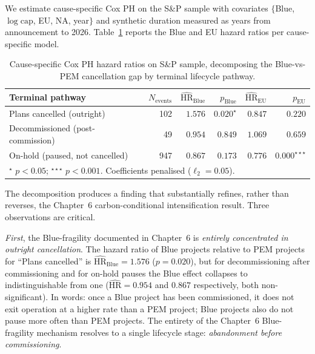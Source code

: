 \documentclass[11pt,a4paper]{article}
\begin{document}
We estimate cause-specific Cox PH on the S\&P sample with covariates $\{$Blue, $\log\mathrm{cap}$, EU, NA, year$\}$ and synthetic duration measured as years from announcement to 2026. Table~\ref{tab:ch8-cr} reports the Blue and EU hazard ratios per cause-specific model.

\begin{table}[ht]
\centering
\caption{Cause-specific Cox PH hazard ratios on S\&P sample, decomposing the Blue-vs-PEM cancellation gap by terminal lifecycle pathway.}
\label{tab:ch8-cr}
\begin{tabular}{lrrrrr}
\toprule
Terminal pathway & $N_{\mathrm{events}}$ & $\widehat{\mathrm{HR}}_{\mathrm{Blue}}$ & $p_{\mathrm{Blue}}$ & $\widehat{\mathrm{HR}}_{\mathrm{EU}}$ & $p_{\mathrm{EU}}$ \\
\midrule
Plans cancelled (outright)       & 102 & $1.576$  & $0.020^{\star}$ & $0.847$ & $0.220$ \\
Decommissioned (post-commission) &  49 & $0.954$  & $0.849$         & $1.069$ & $0.659$ \\
On-hold (paused, not cancelled)  & 947 & $0.867$  & $0.173$         & $0.776$ & $0.000^{\star\star\star}$ \\
\bottomrule
\multicolumn{6}{l}{\footnotesize $^{\star}$ $p<0.05$; $^{\star\star\star}$ $p<0.001$. Coefficients penalised ($\ell_2 = 0.05$).} \\
\end{tabular}
\end{table}

The decomposition produces a finding that substantially refines, rather than reverses, the Chapter~6 carbon-conditional intensification result. Three observations are critical.

\emph{First}, the Blue-fragility documented in Chapter~6 is \emph{entirely concentrated in outright cancellation}. The hazard ratio of Blue projects relative to PEM projects for ``Plans cancelled'' is $\widehat{\mathrm{HR}}_{\mathrm{Blue}} = 1.576$ ($p = 0.020$), but for decommissioning after commissioning and for on-hold pauses the Blue effect collapses to indistinguishable from one ($\widehat{\mathrm{HR}} = 0.954$ and $0.867$ respectively, both non-significant). In words: once a Blue project has been commissioned, it does not exit operation at a higher rate than a PEM project; Blue projects also do not pause more often than PEM projects. The entirety of the Chapter~6 Blue-fragility mechanism resolves to a single lifecycle stage: \emph{abandonment before commissioning}.
\end{document}
